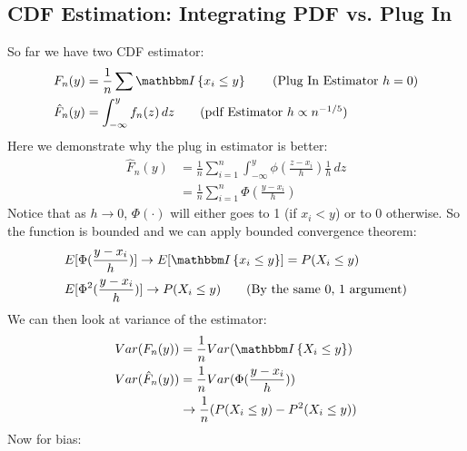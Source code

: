 \subsection{CDF Estimation: Integrating PDF vs. Plug In} 
So far we have two CDF estimator: 
    \begin{align*}
        & F_n(y) = \frac{1}{n}\sum \indic{x_i \leq y} \tag{Plug In Estimator $h=0$} \\
        & \hat{F}_n(y) = \int_{-\infty}^y f_n(z) \, dz \tag{pdf Estimator $h \propto n^{-1/5}$}
    \end{align*}
Here we demonstrate why the plug in estimator is better: 
    \begin{align*}
        \hat{F}_n(y)
        & = \frac{1}{n} \sum_{i=1}^n \int_{-\infty}^y \phi(\frac{z-x_i}{h}) \frac{1}{h} \, dz \\
        & = \frac{1}{n} \sum_{i=1}^n \Phi(\frac{y-x_i}{h})
    \end{align*}
Notice that as $h \to 0$, $\Phi(\cdot)$ will either goes to 1 (if $x_i < y$) or to 0 otherwise. So the function is bounded and we can apply bounded convergence theorem: 
    \begin{align*}
        & E[\Phi(\frac{y-x_i}{h})] \to E[\indic{x_i \leq y}] = P(X_i \leq y) \\
        & E[\Phi^2(\frac{y-x_i}{h})] \to P(X_i \leq y) \tag{By the same 0, 1 argument} 
    \end{align*}
We can then look at variance of the estimator: 
    \begin{align*}
        Var(F_n(y))
        & = \frac{1}{n} Var(\indic{X_i \leq y}) \\
        Var(\hat{F}_n(y)) 
        & = \frac{1}{n} Var(\Phi(\frac{y-x_i}{h})) \\
        & \to \frac{1}{n}(P(X_i \leq y) - P^2(X_i \leq y))
    \end{align*}
Now for bias: 
